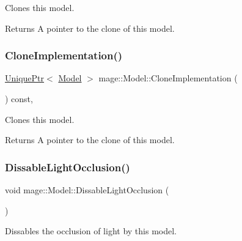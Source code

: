 Clones this model.

\begin{DoxyReturn}{Returns}
A pointer to the clone of this model. 
\end{DoxyReturn}
\hypertarget{classmage_1_1_model_a4e32ba81c5305dd23dfe760765a5b7d2}{}\label{classmage_1_1_model_a4e32ba81c5305dd23dfe760765a5b7d2} 
\subsubsection{\texorpdfstring{Clone\+Implementation()}{CloneImplementation()}}
{\footnotesize\ttfamily \hyperlink{namespacemage_a3316d7143a973e37adf1110f2e80ca31}{Unique\+Ptr}$<$ \hyperlink{classmage_1_1_model}{Model} $>$ mage\+::\+Model\+::\+Clone\+Implementation (\begin{DoxyParamCaption}{ }\end{DoxyParamCaption}) const\hspace{0.3cm}{\ttfamily [private]}, {\ttfamily [virtual]}}

Clones this model.

\begin{DoxyReturn}{Returns}
A pointer to the clone of this model. 
\end{DoxyReturn}
\hypertarget{classmage_1_1_model_a7e21b77f1f0afa83fef7a0398d6a9411}{}\label{classmage_1_1_model_a7e21b77f1f0afa83fef7a0398d6a9411} 
\subsubsection{\texorpdfstring{Dissable\+Light\+Occlusion()}{DissableLightOcclusion()}}
{\footnotesize\ttfamily void mage\+::\+Model\+::\+Dissable\+Light\+Occlusion (\begin{DoxyParamCaption}{ }\end{DoxyParamCaption})\hspace{0.3cm}{\ttfamily [noexcept]}}

Dissables the occlusion of light by this model. \hypertarget{classmage_1_1_model_aa0358375a2906b24ce4f3e0ddc4cdd01}{}\label{classmage_1_1_model_aa0358375a2906b24ce4f3e0ddc4cdd01} 
